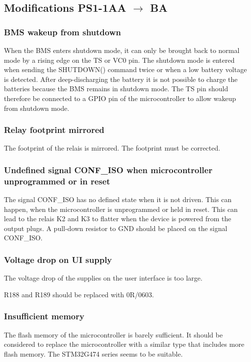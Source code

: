 \subsection{Modifications PS1-1AA $\to$ BA}

\subsubsection{BMS wakeup from shutdown}
When the BMS enters shutdown mode, it can only be brought back to normal mode by a rising edge on the TS or VC0 pin. The shutdown mode is entered when sending the SHUTDOWN() command twice or when a low battery voltage is detected. After deep-discharging the battery it is not possible to charge the batteries because the BMS remains in shutdown mode. The TS pin should therefore be connected to a GPIO pin of the microcontroller to allow wakeup from shutdown mode. 

\subsubsection{Relay footprint mirrored}
The footprint of the relais is mirrored. The footprint must be corrected. 

\subsubsection{Undefined signal CONF\_ISO when microcontroller unprogrammed or in reset}
The signal CONF\_ISO has no defined state when it is not driven. This can happen, when the microcontroller is unprogrammed or held in reset. This can lead to the relais K2 and K3 to flatter when the device is powered from the output plugs. 
A pull-down resistor to GND should be placed on the signal CONF\_ISO. 

\subsubsection{Voltage drop on UI supply}
The voltage drop of the supplies on the user interface is too large. 

R188 and R189 should be replaced with 0R/0603. 

\subsubsection{Insufficient memory}
The flash memory of the microcontroller is barely sufficient. It should be considered to replace the microcontroller with a similar type that includes more flash memory. The STM32G474 series seems to be suitable. 

